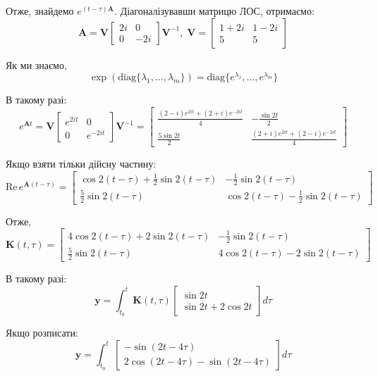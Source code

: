 \documentclass[14pt]{extarticle}
\begin{document}
Отже, знайдемо $e^{(t-\tau)\boldsymbol{A}}$. Діагоналізувавши матрицю ЛОС, отримаємо:
\[
\boldsymbol{A} = \boldsymbol{V}\begin{bmatrix}
    2i & 0 \\ 0 & -2i
\end{bmatrix}\boldsymbol{V}^{-1}, \; \boldsymbol{V} = \begin{bmatrix}
    1+2i & 1-2i \\ 5 & 5
\end{bmatrix}
\]

Як ми знаємо,
\[
\exp \left(\text{diag} \{\lambda_1,\dots,\lambda_m\}\right) =\text{diag} \{e^{\lambda_1},\dots,e^{\lambda_m}\}
\]

В такому разі:
\[
e^{\boldsymbol{A}t} = \boldsymbol{V} \begin{bmatrix}
    e^{2it} & 0 \\ 0 & e^{-2it}
\end{bmatrix} \boldsymbol{V}^{-1} = \begin{bmatrix}
    \frac{(2-i)e^{2it} + (2+i)e^{-2it}}{4} & -\frac{\sin 2t}{2} \\ \frac{5\sin 2t}{2} & \frac{(2+i)e^{2it} + (2-i)e^{-2it}}{4}
\end{bmatrix}
\]

Якщо взяти тільки дійсну частину:
\[
\text{Re} \, e^{\boldsymbol{A}(t-\tau)} = \begin{bmatrix}
    \cos 2(t-\tau) + \frac{1}{2}\sin 2(t-\tau) & -\frac{1}{2}\sin 2(t-\tau) \\ 
    \frac{5}{2}\sin 2(t-\tau) & \cos 2(t-\tau) - \frac{1}{2}\sin 2(t-\tau)
\end{bmatrix}
\]

Отже,
\[
\boldsymbol{K}(t,\tau) = \begin{bmatrix}
    4 \cos 2(t-\tau) + 2\sin 2(t-\tau) & -\frac{1}{2}\sin 2(t-\tau) \\ \frac{5}{2}\sin 2(t-\tau) & 4\cos 2(t-\tau) - 2\sin 2(t-\tau)
\end{bmatrix}
\]

В такому разі:
\[
\textbf{y} = \int_{t_0}^t \boldsymbol{K}(t,\tau)\begin{bmatrix}
    \sin 2t \\ \sin 2t + 2\cos 2t
\end{bmatrix}d\tau 
\]

Якщо розписати:
\[
\textbf{y} = \int_{t_0}^t \begin{bmatrix}-\sin (2t-4\tau) \\ 2\cos(2t-4\tau)-\sin (2t-4\tau)\end{bmatrix}d\tau
\]
\end{document}
